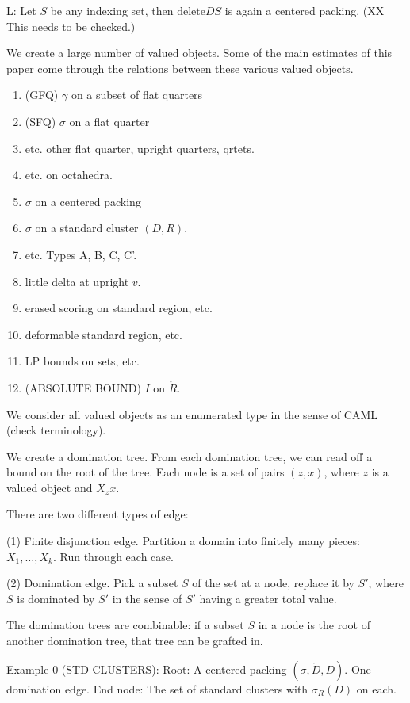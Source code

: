 L: Let $S$ be any indexing set, then $\text{delete} D S$ is again
a centered packing. (XX This needs to be checked.)

We create a large number of valued objects.  Some of the main estimates
of this paper come through the relations between these various valued
objects.

\begin{enumerate}
\item (GFQ) $\gamma$ on a subset of flat quarters \item (SFQ)
$\sigma$ on a flat quarter \item etc. other flat quarter, upright
quarters, qrtets. \item etc. on octahedra. \item $\sigma$ on a
centered packing \item $\sigma$ on a standard cluster $(D,R)$.
\item etc. Types A, B, C, C'. \item little delta at upright $v$.
\item erased scoring on standard region, etc. \item deformable
standard region, etc. \item LP bounds on sets, etc. \item
(ABSOLUTE BOUND) $I$ on $\ring{R}$.
\end{enumerate}

We consider all valued objects as an enumerated type in the sense of CAML
(check terminology).

We create a domination tree.  From each domination tree, we can read off
a bound on the root of the tree.
Each node is a set of pairs $(z,x)$, where $z$ is a valued object and
$X_z x$.

There are two different types of edge:

(1) Finite disjunction edge.
Partition a domain into finitely many pieces: $X_1,\ldots, X_k$.
Run through each case.

(2) Domination edge.  Pick a subset $S$ of the set at a node, replace
it by $S'$, where $S$ is dominated by $S'$ in the sense of $S'$ having
a greater total value.

The domination trees are combinable: if a subset $S$ in a node is
the root of another domination tree, that tree can be grafted in.

Example 0 (STD CLUSTERS): Root: A centered packing
$(\sigma,\ring{D},D)$. One domination edge. End node: The set of
standard clusters with $\sigma_R(D)$ on each.

